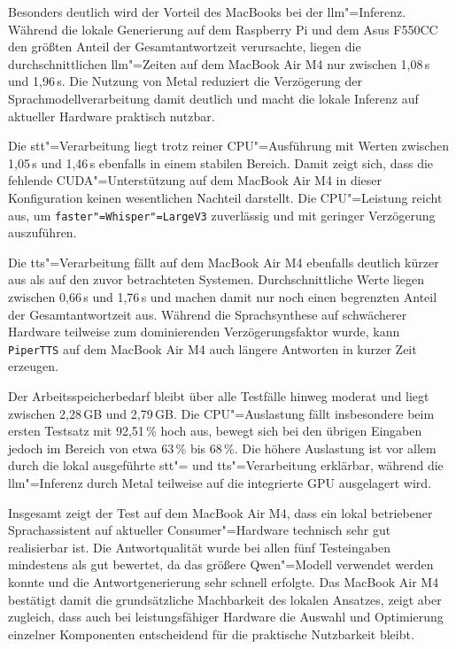 Besonders deutlich wird der Vorteil des MacBooks bei der \gls{llm}"=Inferenz. Während die lokale Generierung auf dem Raspberry Pi und dem Asus F550CC den größten Anteil der Gesamtantwortzeit verursachte, liegen die durchschnittlichen \gls{llm}"=Zeiten auf dem MacBook Air M4 nur zwischen 1,08\,s und 1,96\,s. Die Nutzung von Metal reduziert die Verzögerung der Sprachmodellverarbeitung damit deutlich und macht die lokale Inferenz auf aktueller Hardware praktisch nutzbar.

Die \gls{stt}"=Verarbeitung liegt trotz reiner CPU"=Ausführung mit Werten zwischen 1,05\,s und 1,46\,s ebenfalls in einem stabilen Bereich. Damit zeigt sich, dass die fehlende CUDA"=Unterstützung auf dem MacBook Air M4 in dieser Konfiguration keinen wesentlichen Nachteil darstellt. Die CPU"=Leistung reicht aus, um \texttt{faster"=Whisper"=LargeV3} zuverlässig und mit geringer Verzögerung auszuführen.

Die \gls{tts}"=Verarbeitung fällt auf dem MacBook Air M4 ebenfalls deutlich kürzer aus als auf den zuvor betrachteten Systemen. Durchschnittliche Werte liegen zwischen 0,66\,s und 1,76\,s und machen damit nur noch einen begrenzten Anteil der Gesamtantwortzeit aus. Während die Sprachsynthese auf schwächerer Hardware teilweise zum dominierenden Verzögerungsfaktor wurde, kann \texttt{PiperTTS} auf dem MacBook Air M4 auch längere Antworten in kurzer Zeit erzeugen.

Der Arbeitsspeicherbedarf bleibt über alle Testfälle hinweg moderat und liegt zwischen 2,28\,GB und 2,79\,GB. Die CPU"=Auslastung fällt insbesondere beim ersten Testsatz mit 92,51\,\% hoch aus, bewegt sich bei den übrigen Eingaben jedoch im Bereich von etwa 63\,\% bis 68\,\%. Die höhere Auslastung ist vor allem durch die lokal ausgeführte \gls{stt}"= und \gls{tts}"=Verarbeitung erklärbar, während die \gls{llm}"=Inferenz durch Metal teilweise auf die integrierte GPU ausgelagert wird.

Insgesamt zeigt der Test auf dem MacBook Air M4, dass ein lokal betriebener Sprachassistent auf aktueller Consumer"=Hardware technisch sehr gut realisierbar ist. Die Antwortqualität wurde bei allen fünf Testeingaben mindestens als gut bewertet, da das größere Qwen"=Modell verwendet werden konnte und die Antwortgenerierung sehr schnell erfolgte. Das MacBook Air M4 bestätigt damit die grundsätzliche Machbarkeit des lokalen Ansatzes, zeigt aber zugleich, dass auch bei leistungsfähiger Hardware die Auswahl und Optimierung einzelner Komponenten entscheidend für die praktische Nutzbarkeit bleibt.



